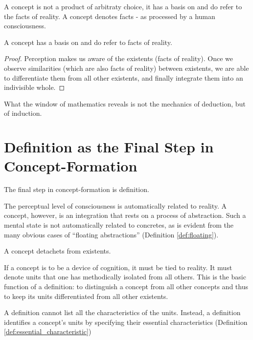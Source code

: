         A concept is not a product of arbitraty choice, it has a basis on and do refer to the facts of reality. A concept denotes facts - as processed by a human consciousness.

            \begin{theorem}
                A concept has a basis on and do refer to facts of reality.
            \end{theorem}

            \begin{proof}
                Perception makes us aware of the existents (facts of reality). Once we observe similarities (which are also facts of reality) between existents, we are able to differentiate them from all other existents, and finally integrate them into an indivisible whole.
            \end{proof}

        What the window of mathematics reveals is not the mechanics of deduction, but of induction. 

    \section{Definition as the Final Step in Concept-Formation}

        The final step in concept-formation is definition.

        The perceptual level of consciousness is automatically related to reality. A concept, however, is an integration that rests on a process of abstraction. Such a mental state is not automatically related to concretes, as is evident from the many obvious cases of ``floating abstractions'' (Definition \ref{def:floating}).

            \begin{definition}
            \label{def:floating}
                A concept detachets from existents.
            \end{definition}

        If a concept is to be a device of cognition, it must be tied to reality. It must denote units that one has methodically isolated from all others. This is the basic function of a definition: to distinguish a concept from all other concepts and thus to keep its units differentiated from all other existents.

        A definition cannot list all the characteristics of the units. Instead, a definition identifies a concept's units by specifying their essential characteristics (Definition \ref{def:essential_characteristic}) 

